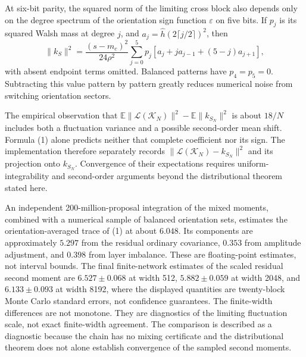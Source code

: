 \documentclass[11pt]{article}
\newcommand{\E}{\mathbb E}\newcommand{\R}{\mathbb R}
\begin{document}
At six-bit parity, the squared norm of the limiting cross block also
depends only on the degree spectrum of the orientation sign function
$\varepsilon$ on five bits. If $p_j$ is its squared Walsh mass at
degree $j$, and $a_j=\widehat h(2\lceil j/2\rceil)^2$, then
\[
 \|k_S\|^2=\frac{(s-m_c)^2}{24\rho^2}
       \sum_{j=0}^5p_j[a_j+j a_{j-1}+(5-j)a_{j+1}],
\]
with absent endpoint terms omitted. Balanced patterns have $p_4=p_5=0$.
Subtracting this value pattern by pattern greatly reduces numerical
noise from switching orientation sectors.

The empirical observation that
$\E\|\mathcal L(\mathcal K_N)\|^2-\E\|k_{S_N}\|^2$
is about $18/N$ includes both a fluctuation variance and a possible
second-order mean shift. Formula (1) alone predicts neither that complete
coefficient nor its sign. The implementation therefore separately records
$\|\mathcal L(\mathcal K_N)-k_{S_N}\|^2$ and its projection onto $k_{S_N}$.
Convergence of their expectations requires uniform-integrability and
second-order arguments beyond the distributional theorem stated here.

An independent 200-million-proposal integration of the mixed moments,
combined with a numerical sample of balanced orientation sets, estimates
the orientation-averaged trace of (1) at about $6.048$. Its components
are approximately $5.297$ from the residual ordinary covariance,
$0.353$ from amplitude adjustment, and $0.398$ from layer imbalance.
These are floating-point estimates, not interval bounds. The final
finite-network estimates of the scaled residual second moment are
$6.527\pm0.068$ at width 512, $5.882\pm0.059$ at width 2048, and
$6.133\pm0.093$ at width 8192, where the displayed quantities are
twenty-block Monte Carlo standard errors, not confidence guarantees.
The finite-width differences are not monotone. They are diagnostics of
the limiting fluctuation scale, not exact finite-width agreement.
The comparison is described as a diagnostic because
the chain has no mixing certificate and the distributional theorem does
not alone establish convergence of the sampled second moments.
\end{document}
